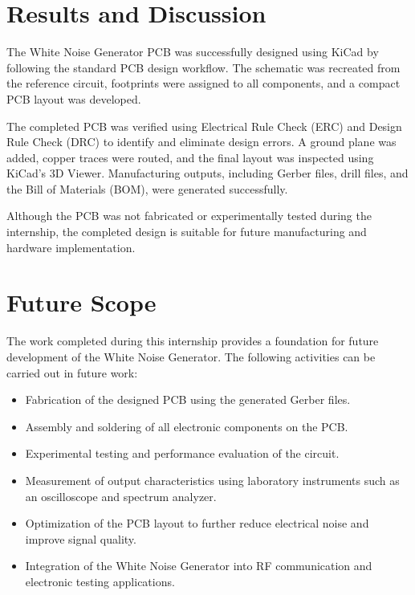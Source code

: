 \section{Results and Discussion}

The White Noise Generator PCB was successfully designed using KiCad by following the standard PCB design workflow. The schematic was recreated from the reference circuit, footprints were assigned to all components, and a compact PCB layout was developed.

The completed PCB was verified using Electrical Rule Check (ERC) and Design Rule Check (DRC) to identify and eliminate design errors. A ground plane was added, copper traces were routed, and the final layout was inspected using KiCad's 3D Viewer. Manufacturing outputs, including Gerber files, drill files, and the Bill of Materials (BOM), were generated successfully.

Although the PCB was not fabricated or experimentally tested during the internship, the completed design is suitable for future manufacturing and hardware implementation.


\section{Future Scope}

The work completed during this internship provides a foundation for future development of the White Noise Generator. The following activities can be carried out in future work:

\begin{itemize}
    \item Fabrication of the designed PCB using the generated Gerber files.
    \item Assembly and soldering of all electronic components on the PCB.
    \item Experimental testing and performance evaluation of the circuit.
    \item Measurement of output characteristics using laboratory instruments such as an oscilloscope and spectrum analyzer.
    \item Optimization of the PCB layout to further reduce electrical noise and improve signal quality.
    \item Integration of the White Noise Generator into RF communication and electronic testing applications.
\end{itemize}

